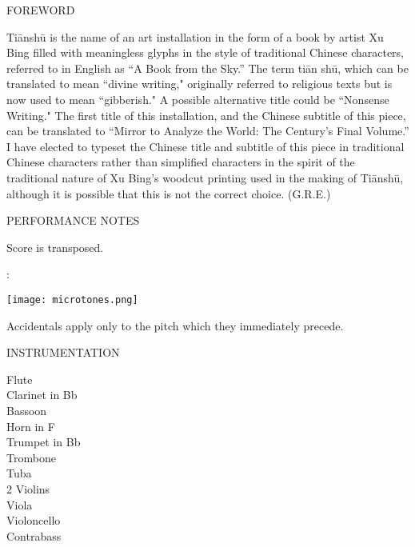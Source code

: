 \documentclass[10pt]{article}
\begin{document}
\begin{center}
\huge FOREWORD
\end{center}

\begin{center}
Ti\=ansh\=u is the name of an art installation in the form of a book by artist Xu Bing filled with meaningless glyphs in the style of traditional Chinese characters, referred to in English as ``A Book from the Sky.'' The term ti\=an sh\=u, which can be translated to mean ``divine writing," originally referred to religious texts but is now used to mean ``gibberish." A possible alternative title could be ``Nonsense Writing." The first title of this installation, and the Chinese subtitle of this piece, can be translated to ``Mirror to Analyze the World: The Century's Final Volume.'' I have elected to typeset the Chinese title and subtitle of this piece in traditional Chinese characters rather than simplified characters in the spirit of the traditional nature of Xu Bing's woodcut printing used in the making of Ti\=ansh\=u, although it is possible that this is not the correct choice.
\rightskip\leftskip
\phantom{text} \hfill (G.R.E.)
  \end{center}
  
\vspace*{1\baselineskip}

\begin{center}
\huge PERFORMANCE NOTES
\end{center}

\begin{center}
Score is transposed.
\end{center}

\begin{center}
:
\end{center}

\begin{center}
\texttt{[image: microtones.png]}
\end{center}

\begin{center}
Accidentals apply only to the pitch which they immediately precede.
\end{center}

\vspace*{0.3\baselineskip}

\begin{center}
\huge INSTRUMENTATION
\end{center}
\begin{center}
Flute \\
Clarinet in Bb \\
Bassoon \\
Horn in F \\
Trumpet in Bb \\
Trombone \\
Tuba \\
2 Violins \\
Viola \\
Violoncello \\
Contrabass
\end{center}
\end{document}
